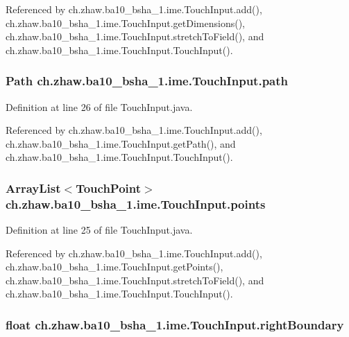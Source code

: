 Referenced by ch.zhaw.ba10\_\-bsha\_\-1.ime.TouchInput.add(), ch.zhaw.ba10\_\-bsha\_\-1.ime.TouchInput.getDimensions(), ch.zhaw.ba10\_\-bsha\_\-1.ime.TouchInput.stretchToField(), and ch.zhaw.ba10\_\-bsha\_\-1.ime.TouchInput.TouchInput().\hypertarget{classch_1_1zhaw_1_1ba10__bsha__1_1_1ime_1_1TouchInput_ae40ac5199f39cda2322b9b74b4f388aa}{
\subsubsection[{path}]{\setlength{\rightskip}{0pt plus 5cm}Path {\bf ch.zhaw.ba10\_\-bsha\_\-1.ime.TouchInput.path}}}
\label{classch_1_1zhaw_1_1ba10__bsha__1_1_1ime_1_1TouchInput_ae40ac5199f39cda2322b9b74b4f388aa}


Definition at line 26 of file TouchInput.java.

Referenced by ch.zhaw.ba10\_\-bsha\_\-1.ime.TouchInput.add(), ch.zhaw.ba10\_\-bsha\_\-1.ime.TouchInput.getPath(), and ch.zhaw.ba10\_\-bsha\_\-1.ime.TouchInput.TouchInput().\hypertarget{classch_1_1zhaw_1_1ba10__bsha__1_1_1ime_1_1TouchInput_a03a322fbe00768dea16f01801bdcc3b8}{
\subsubsection[{points}]{\setlength{\rightskip}{0pt plus 5cm}ArrayList$<${\bf TouchPoint}$>$ {\bf ch.zhaw.ba10\_\-bsha\_\-1.ime.TouchInput.points}}}
\label{classch_1_1zhaw_1_1ba10__bsha__1_1_1ime_1_1TouchInput_a03a322fbe00768dea16f01801bdcc3b8}


Definition at line 25 of file TouchInput.java.

Referenced by ch.zhaw.ba10\_\-bsha\_\-1.ime.TouchInput.add(), ch.zhaw.ba10\_\-bsha\_\-1.ime.TouchInput.getPoints(), ch.zhaw.ba10\_\-bsha\_\-1.ime.TouchInput.stretchToField(), and ch.zhaw.ba10\_\-bsha\_\-1.ime.TouchInput.TouchInput().\hypertarget{classch_1_1zhaw_1_1ba10__bsha__1_1_1ime_1_1TouchInput_a2006af7bf2e20ee8082b41b0ff80810a}{
\subsubsection[{rightBoundary}]{\setlength{\rightskip}{0pt plus 5cm}float {\bf ch.zhaw.ba10\_\-bsha\_\-1.ime.TouchInput.rightBoundary}}}
\label{classch_1_1zhaw_1_1ba10__bsha__1_1_1ime_1_1TouchInput_a2006af7bf2e20ee8082b41b0ff80810a}


